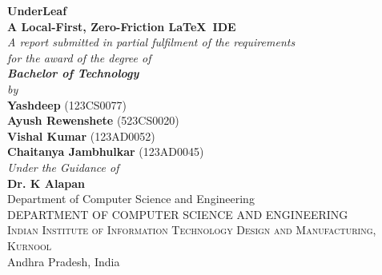 \documentclass[11pt, a4paper]{article}
\begin{document}
\begin{titlepage}
\begin{center}

\vspace*{0.4cm}
{\huge \bfseries UnderLeaf}\\[0.2cm]
{\LARGE \bfseries A Local-First, Zero-Friction \LaTeX\ IDE}\\[0.8cm]

\large \textit{A report submitted in partial fulfilment of the requirements\\ for the award of the degree of \\ \textbf{Bachelor of Technology}}\\[0.6cm]
\textit{by}\\[0.4cm]

{\Large \textbf{Yashdeep} (123CS0077)}\\
{\Large \textbf{Ayush Rewenshete} (523CS0020)}\\
{\Large \textbf{Vishal Kumar} (123AD0052)}\\
{\Large \textbf{Chaitanya Jambhulkar} (123AD0045)}\\[1cm]

\textit{Under the Guidance of}\\[0.3cm]
{\large \textbf{Dr. K Alapan}}\\
Department of Computer Science and Engineering\\[0.9cm]


{\large DEPARTMENT OF COMPUTER SCIENCE AND ENGINEERING}\\
\textsc{Indian Institute of Information Technology Design and Manufacturing, Kurnool}\\[0.3cm]
{\large Andhra Pradesh, India}\\[0.1cm]

\end{center}
\end{titlepage}

\thispagestyle{empty}

\begin{abstract}
UnderLeaf is a modern, zero-configuration \LaTeX\ Integrated Development Environment (IDE) built using a locally bundled Tectonic compilation engine and a Wails-based native desktop shell. Its core thesis is that a \LaTeX\ document is the \textbf{frontend for your research} — it should behave like a live, reactive interface rather than a passive source file. By embedding a complete compiler, a real-time math renderer, a visual table editor, and an automatic version-history system into a single standalone binary, UnderLeaf removes every barrier between a researcher and a compiled PDF while remaining entirely offline and requiring zero prior \LaTeX\ toolchain knowledge.
\end{abstract}
\end{document}
